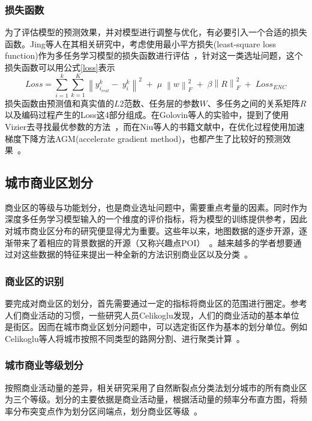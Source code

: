\documentclass{llncs}
\begin{document}
\subsubsection{损失函数}
为了评估模型的预测效果，并对模型进行调整与优化，有必要引入一个合适的损失函数。Jing等人在其相关研究中，考虑使用最小平方损失(least-square loss function)作为多任务学习模型的损失函数进行评估~\cite{Jing2016Where}，针对这一类选址问题，这个损失函数可以用公式\ref{loss}表示
\begin{equation}
	\label{loss}
	Loss=\sum_{i=1}^k\sum_{k=1}^K\left\|y_{i_{real}}^k-\;y_i^k\right\|^2\;+\;\mu\;\left\|w\right\|_F^2\;+\;\beta\left\|R\right\|_F^2\;+\;Loss_{ENC}
\end{equation}
损失函数由预测值和真实值的$L2$范数、任务层的参数$W$、多任务之间的关系矩阵$R$以及编码过程产生的Loss这4部分组成。在Golovin等人的实验中，提到了使用Vizier去寻找最优参数的方法~\cite{Golovin2017Google}，而在Niu等人的书籍文献中，在优化过程使用加速梯度下降方法AGM(accelerate gradient method)，也都产生了比较好的预测效果~\cite{Niu2016Exploiting}。


\subsection{城市商业区划分}
商业区的等级与功能划分，也是商业选址问题中，需要重点考量的因素。同时作为深度多任务学习模型输入的一个维度的评价指标，将为模型的训练提供参考，因此对城市商业区分布的研究便显得尤为重要。这些年以来，地图数据的逐步开源，逐渐带来了着相应的背景数据的开源（又称兴趣点POI）~\cite{feng2015personalized,yin2016adapting}。越来越多的学者想要通过对这些数据的特征来提出一种全新的方法识别商业区以及分类~\cite{wang2015shangyefenji}。
\subsubsection{商业区的识别}
要完成对商业区的划分，首先需要通过一定的指标将商业区的范围进行圈定。参考人们商业活动的习惯，一些研究人员Celikoglu发现，人们的商业活动的基本单位是街区。因而在城市商业区划分问题中，可以选定街区作为基本的划分单位。例如Celikoglu等人将城市按照不同类型的路网分割、进行聚类计算~\cite{celikoglu2016extension}。
\subsubsection{城市商业等级划分}
按照商业活动量的差异，相关研究采用了自然断裂点分类法划分城市的所有商业区为三个等级。划分的主要依据是商业活动量，根据活动量的频率分布直方图，将频率分布突变点作为划分区间端点，划分商业区等级~\cite{li2018ziranduanlie}。
\end{document}
